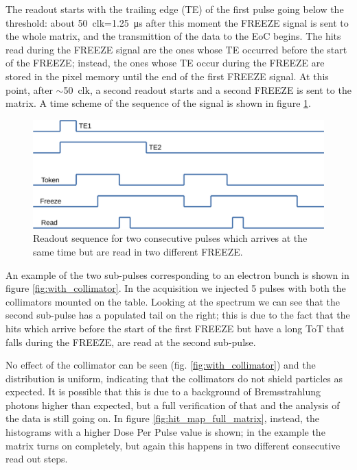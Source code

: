    The readout starts with the trailing edge (TE) of the first pulse going below the threshold: about \SI{50}{clk}=\SI{1.25}{\us} after this moment the FREEZE signal is sent to the whole matrix, and the transmittion of the data to the EoC begins.
   The hits read during the FREEZE signal are the ones whose TE occurred before the start of the FREEZE; instead, the ones whose TE occur during the FREEZE are stored in the pixel memory until the end of the first FREEZE signal. At this point, after $\sim$\SI{50}{clk}, a second readout starts and a second FREEZE is sent to the matrix.  
   A time scheme of the sequence of the signal is shown in figure \ref{fig:time_scheme}.
   \begin{figure}
      \centering
      \includegraphics[width=0.8\linewidth]{figures/test_beam/time.pdf}
      \caption{Readout sequence for two consecutive pulses which arrives at the same time but are read in two different FREEZE.}
      \label{fig:time_scheme}
   \end{figure}

   An example of the two sub-pulses corresponding to an electron bunch is shown in figure \ref{fig:with_collimator}. In the acquisition we injected 5 pulses with both the collimators mounted on the table. 
   Looking at the spectrum we can see that the second sub-pulse has a populated tail on the right; this is due to the fact that the hits which arrive before the start of the first FREEZE but have a long ToT that falls during the FREEZE, are read at the second sub-pulse. 
   
   No effect of the collimator can be seen (fig. \ref{fig:with_collimator}) and the distribution is uniform, indicating that the collimators do not shield particles as expected.
   It is possible that this is due to a background of Bremsstrahlung photons higher than expected, but a full verification of that and the analysis of the data is still going on. 
   In figure \ref{fig:hit_map_full_matrix}, instead, the histograms with a higher Dose Per Pulse value is shown; in the example the matrix turns on completely, but again this happens in two different consecutive read out steps. 

